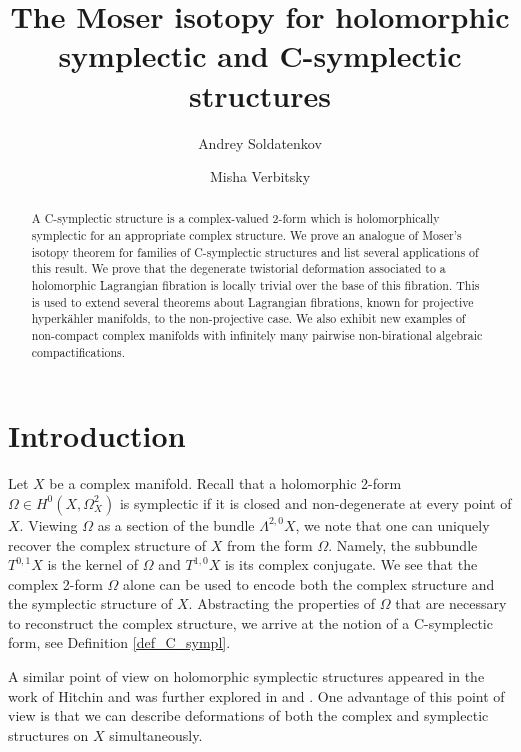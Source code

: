 \documentclass[10pt]{amsart}
\title{The Moser isotopy for holomorphic symplectic and C-symplectic structures}
\author{Andrey Soldatenkov}
\author{Misha Verbitsky}
\newcommand{\version}{Version 1.3, \today}
\begin{document}
\begin{abstract}
A C-symplectic structure is a complex-valued 
2-form which is holomorphically symplectic for
an appropriate complex structure.
We prove an analogue of Moser's isotopy theorem for families of
C-symplectic structures and list several applications of
this result. We prove that the degenerate twistorial
deformation associated to a holomorphic Lagrangian
fibration is locally trivial over the base of this
fibration. This is used to extend several theorems about Lagrangian
fibrations, known for projective hyperk\"ahler manifolds,
to the non-projective case. We also exhibit new examples
of non-compact complex manifolds with infinitely many pairwise
non-birational algebraic compactifications. 
\end{abstract}

\maketitle
\fancypagestyle{plain}{
  \fancyhf{}
  \cfoot{\small -- \thepage \ --} \rfoot{\tiny \sc\version}
  \renewcommand{\headrulewidth}{0pt}%
}
\thispagestyle{plain}

{\small
\tableofcontents
}

\section{Introduction}


Let $X$ be a complex manifold.
Recall that a holomorphic 2-form $\Omega\in H^0(X,\Omega^2_X)$
is symplectic if it is closed and non-degenerate
at every point of $X$. Viewing $\Omega$ as
a section of the bundle $\Lambda^{2,0}X$,
we note that one can uniquely recover the complex structure of $X$
from the form $\Omega$. Namely, the subbundle $T^{0,1}X$ is
the kernel of $\Omega$ and $T^{1,0}X$ is its complex conjugate.
We see that the complex 2-form $\Omega$ alone can be used
to encode both the complex structure and the symplectic structure
of $X$. Abstracting the properties of $\Omega$ that are necessary
to reconstruct the complex structure, we arrive at the 
notion of a C-symplectic form, see Definition \ref{def_C_sympl}.

A similar point of view on holomorphic symplectic structures
appeared in the work of Hitchin \cite{Hi1} and was further
explored in \cite{V2} and \cite{BDV}. One advantage of this
point of view is that we can describe
deformations of both the complex and symplectic structures on $X$
simultaneously.
\end{document}
